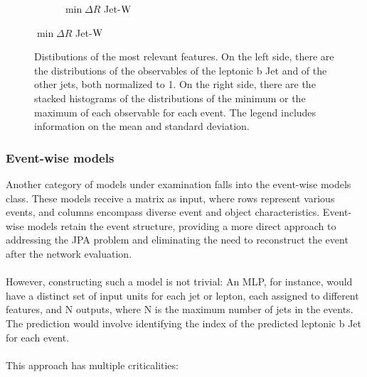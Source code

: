 \begin{figure}[H]
\begin{subfigure}{0.475\linewidth}
        \caption{$\min \Delta R$ Jet-${\text{W}}$}
    \end{subfigure}  
\end{figure}

\newpage
\begin{figure}[H]
    \ContinuedFloat
    \vspace{-0.5cm}
    \centering
    \caption{Distibutions of the most relevant features. On the left side, there are the distributions of the observables of the leptonic b Jet and of the other jets, both normalized to 1.
On the right side, there are the stacked histograms of the distributions of the minimum or the maximum of each observable for each event.
The legend includes information on the mean and standard deviation.}
\end{figure}

\subsubsection*{Event-wise models}
Another category of models under examination falls into the event-wise models class. These models receive a matrix as input, where rows represent various events, and columns encompass diverse event and object characteristics. 
Event-wise models retain the event structure, providing a more direct approach to addressing the JPA problem and eliminating the need to reconstruct the event after the network evaluation.\\
\\
However, constructing such a model is not trivial: An MLP, for instance, would have a distinct set of input units for each jet or lepton, each assigned to different features, and N outputs, where N is the maximum number of jets in the events. The prediction would involve identifying the index of the predicted leptonic b Jet for each event.\\
\\
This approach has multiple criticalities:
